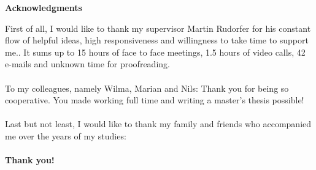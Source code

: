 \thispagestyle{empty}
\vspace*{1.0cm}

\begin{center}
    {\LARGE \textbf{Acknowledgments}}
\end{center}

\vspace*{0.5cm}

First of all, I would like to thank my supervisor Martin Rudorfer for his constant flow of helpful ideas, high responsiveness and willingness to take time to support me.. It sums up to 15 hours of face to face meetings, 1.5 hours of video calls, 42 e-mails and unknown time for proofreading.\\ \\
\noindent
To my colleagues, namely Wilma, Marian and Nils: Thank you for being so cooperative. You made working full time and writing a master's thesis possible!\\ \\
\noindent
Last but not least, I would like to thank my family and friends who accompanied me over the years of my studies:\\ \\

\textbf{Thank you!}